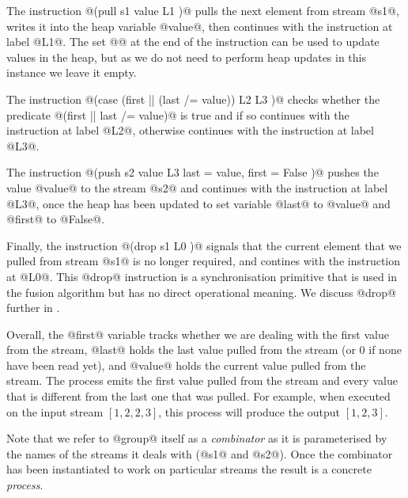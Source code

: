 The instruction @(pull s1 value L1 {})@ pulls the next element from stream @s1@, writes it into the heap variable @value@, then continues with the instruction at label @L1@. The set @{}@ at the end of the instruction can be used to update values in the heap, but as we do not need to perform heap updates in this instance we leave it empty. 

The instruction @(case (first || (last /= value)) L2 {} L3 {})@ checks whether the predicate @(first || last /= value)@ is true and if so continues with the instruction at label @L2@, otherwise continues with the instruction at label @L3@. 

The instruction @(push s2 value L3 { last = value, first = False })@ pushes the value @value@ to the stream @s2@ and continues with the instruction at label @L3@, once the heap has been updated to set variable @last@ to @value@ and @first@ to @False@. 

Finally, the instruction @(drop s1 L0 {})@ signals that the current element that we pulled from stream @s1@ is no longer required, and contines with the instruction at @L0@. This @drop@ instruction is a synchronisation primitive that is used in the fusion algorithm but has no direct operational meaning. We discuss @drop@ further in . 

Overall, the @first@ variable tracks whether we are dealing with the first value from the stream, @last@ holds the last value pulled from the stream (or 0 if none have been read yet), and @value@ holds the current value pulled from the stream. The process emits the first value pulled from the stream and every value that is different from the last one that was pulled. For example, when executed on the input stream $[1, 2, 2, 3]$, this process will produce the output $[1, 2, 3]$.

Note that we refer to @group@ itself as a \emph{combinator} as it is parameterised by the names of the streams it deals with (@s1@ and @s2@). Once the combinator has been instantiated to work on particular streams the result is a concrete \emph{process}. 




